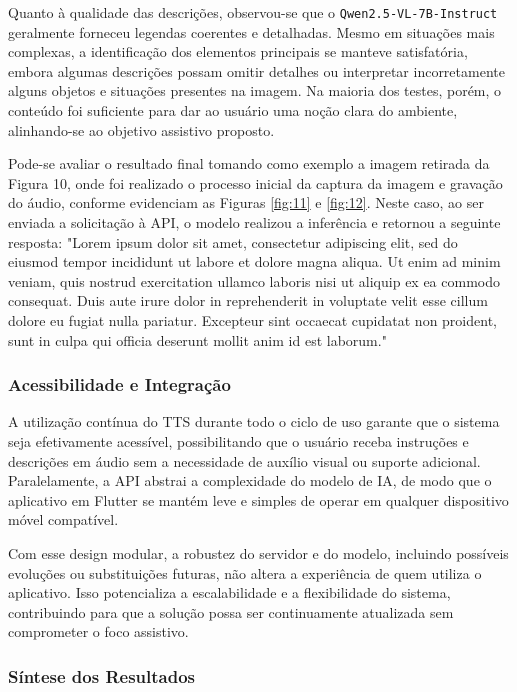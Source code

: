 Quanto à qualidade das descrições, observou-se que o \texttt{Qwen2.5-VL-7B-Instruct} geralmente forneceu legendas coerentes e detalhadas. Mesmo em situações mais complexas, a identificação dos elementos principais se manteve satisfatória, embora algumas descrições possam omitir detalhes ou interpretar incorretamente alguns objetos e situações presentes na imagem. Na maioria dos testes, porém, o conteúdo foi suficiente para dar ao usuário uma noção clara do ambiente, alinhando-se ao objetivo assistivo proposto.

Pode-se avaliar o resultado final tomando como exemplo a imagem retirada da Figura 10, onde foi realizado o processo inicial da captura da imagem e gravação do áudio, conforme evidenciam as Figuras \ref{fig:11} e \ref{fig:12}. Neste caso, ao ser enviada a solicitação à API, o modelo realizou a inferência e retornou a seguinte resposta: "Lorem ipsum dolor sit amet, consectetur adipiscing elit, sed do eiusmod tempor incididunt ut labore et dolore magna aliqua. Ut enim ad minim veniam, quis nostrud exercitation ullamco laboris nisi ut aliquip ex ea commodo consequat. Duis aute irure dolor in reprehenderit in voluptate velit esse cillum dolore eu fugiat nulla pariatur. Excepteur sint occaecat cupidatat non proident, sunt in culpa qui officia deserunt mollit anim id est laborum."

\subsubsection{Acessibilidade e Integração}

A utilização contínua do TTS durante todo o ciclo de uso garante que o sistema seja efetivamente acessível, possibilitando que o usuário receba instruções e descrições em áudio sem a necessidade de auxílio visual ou suporte adicional. Paralelamente, a API abstrai a complexidade do modelo de IA, de modo que o aplicativo em Flutter se mantém leve e simples de operar em qualquer dispositivo móvel compatível.

Com esse design modular, a robustez do servidor e do modelo, incluindo possíveis evoluções ou substituições futuras, não altera a experiência de quem utiliza o aplicativo. Isso potencializa a escalabilidade e a flexibilidade do sistema, contribuindo para que a solução possa ser continuamente atualizada sem comprometer o foco assistivo.

\subsubsection{Síntese dos Resultados}

